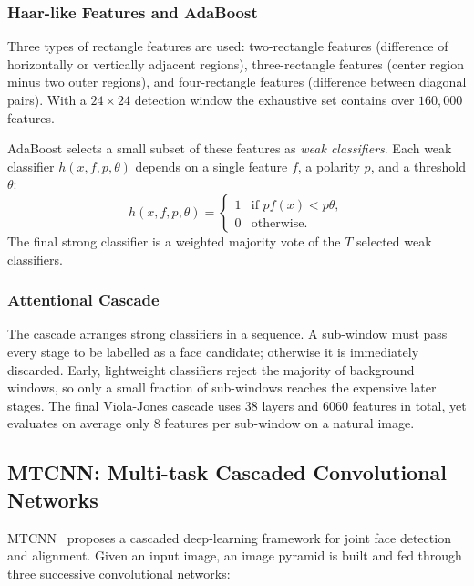 \documentclass{article}
\begin{document}
\subsubsection{Haar-like Features and AdaBoost}

Three types of rectangle features are used: two-rectangle features
(difference of horizontally or vertically adjacent regions),
three-rectangle features (center region minus two outer regions), and
four-rectangle features (difference between diagonal pairs). With a
$24\times 24$ detection window the exhaustive set contains over
$160{,}000$ features.

AdaBoost selects a small subset of these features as \emph{weak
classifiers}. Each weak classifier $h(x,f,p,\theta)$ depends on a
single feature $f$, a polarity $p$, and a threshold $\theta$:
\begin{equation}
    h(x,f,p,\theta)=
    \begin{cases}
        1 & \text{if } pf(x) < p\theta,\\
        0 & \text{otherwise.}
    \end{cases}
\end{equation}
The final strong classifier is a weighted majority vote of the $T$
selected weak classifiers.

\subsubsection{Attentional Cascade}

The cascade arranges strong classifiers in a sequence. A sub-window
must pass every stage to be labelled as a face candidate; otherwise
it is immediately discarded. Early, lightweight classifiers reject
the majority of background windows, so only a small fraction of
sub-windows reaches the expensive later stages. The final
Viola-Jones cascade uses 38 layers and 6060 features in total,
yet evaluates on average only 8 features per sub-window on a
natural image.

\subsection{MTCNN: Multi-task Cascaded Convolutional Networks}

MTCNN~\cite{zhang2016joint} proposes a cascaded deep-learning
framework for joint face detection and alignment. Given an input
image, an image pyramid is built and fed through three successive
convolutional networks:
\end{document}
